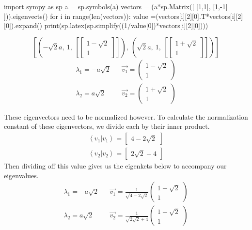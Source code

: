 \documentclass[]{article}
\newenvironment{Shaded}{\begin{snugshade}}{\end{snugshade}}
\newcommand{\NormalTok}[1]{#1}
\begin{document}
\begin{Shaded}
\begin{Highlighting}[]
\NormalTok{import sympy as sp}
\NormalTok{a = sp.symbols(\textquotesingle{}a\textquotesingle{})}
\NormalTok{vectors = (a*sp.Matrix([}
\NormalTok{     [1,1],}
\NormalTok{     [1,{-}1]}
\NormalTok{])).eigenvects()}
\NormalTok{for i in range(len(vectors)):}
\NormalTok{    value =(vectors[i][2][0].T*vectors[i][2][0]).expand()}
\NormalTok{    print(sp.latex(sp.simplify((1/value[0])*vectors[i][2][0])))}
\end{Highlighting}
\end{Shaded}

\[
\left[ \left( - \sqrt{2} a, \ 1, \ \left[ \left[\begin{matrix}1 - \sqrt{2}\\1\end{matrix}\right]\right]\right), \ \left( \sqrt{2} a, \ 1, \ \left[ \left[\begin{matrix}1 + \sqrt{2}\\1\end{matrix}\right]\right]\right)\right]
\] \[
\begin{align}
\lambda_{1} =-a\sqrt{ 2 } &&\vec{v_{1}} = \begin{pmatrix}1 - \sqrt{2}\\1\end{pmatrix} \\
\lambda_{2} =a\sqrt{ 2 } &&\vec{v_{2}} = \begin{pmatrix}1 + \sqrt{2}\\1\end{pmatrix}
\end{align}
\]

These eigenvectors need to be normalized however. To calculate the
normalization constant of these eigenvectors, we divide each by their
inner product. \[
\begin{align}
\left<v_{1}|v_{1}\right> = \left[\begin{matrix}4 - 2 \sqrt{2}\end{matrix}\right]  \\
\left<v_{2}|v_{2}\right> =  \left[\begin{matrix}2 \sqrt{2} + 4\end{matrix}\right]
\end{align}
\] Then dividing off this value gives us the eigenkets below to
accompany our eigenvalues. \[
\begin{align}
\lambda_{1} =-a\sqrt{ 2 } &&\vec{v_{1}} = \frac{1}{\sqrt{ 4-2\sqrt{ 2 } }}\begin{pmatrix}1 - \sqrt{2}\\1\end{pmatrix} \\
\lambda_{2} =a\sqrt{ 2 } &&\vec{v_{2}} = \frac{1}{\sqrt{ 2\sqrt{ 2 }+4 }}\begin{pmatrix}1 + \sqrt{2}\\1\end{pmatrix}
\end{align}
\]
\end{document}
